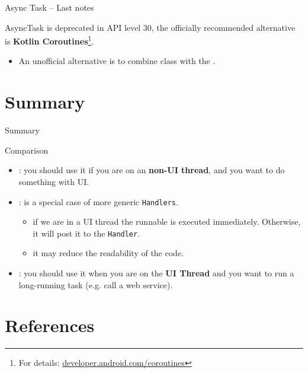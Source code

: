 \documentclass{beamer}
\begin{document}
  \begin{frame}{Async Task -- Last notes}
    \begin{block}{}
      AsyncTask is deprecated in API level 30, the officially recommended alternative 
      is \textbf{Kotlin Coroutines}\footnote{For details: \href{https://developer.android.com/topic/libraries/architecture/coroutines}{developer.android.com/coroutines}}.
      \begin{itemize}
        \item An unofficial alternative is to combine  class with the .
      \end{itemize}
    \end{block}
    \begin{exampleblock}{}
      
    \end{exampleblock}
  \end{frame}

\section*{Summary}
  \begin{frame}{Summary}
    \begin{block}{Comparison}
      \begin{itemize}
        \item {}: you should use it if you are on an \textbf{non-UI thread},
        and you want to do something with UI.
        \item {}: is a special case of more generic \texttt{Handlers}.
        \begin{itemize}
          \item if we are in a UI thread the runnable is executed immediately. 
          Otherwise, it will post it to the \texttt{Handler}.
          \item it may reduce the readability of the code.
        \end{itemize}
        \item {}: you should use it when you are on the \textbf{UI Thread} and you want 
        to run a long-running task (e.g. call a web service).
      \end{itemize}
    \end{block}
  \end{frame}



\section*{References}

\end{document}
